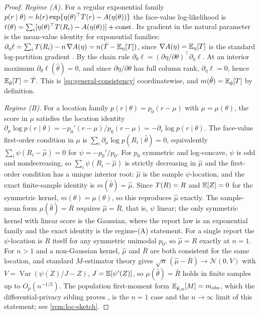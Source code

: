\begin{proof}
\emph{Regime (A).} For a regular exponential family $p(r \mid \theta)
= h(r)\exp\{\eta(\theta)^\top T(r) - A(\eta(\theta))\}$ the
face-value log-likelihood is $\ell(\theta) = \sum_i [\eta(\theta)^\top
T(R_i) - A(\eta(\theta))] + \text{const}$. Its gradient in the
natural parameter is the mean-value identity for exponential families:
$\partial_\eta \ell = \sum_i T(R_i) - n\,\nabla A(\eta) = n(\bar{T} -
\mathbb{E}_\eta[T])$, since $\nabla A(\eta) = \mathbb{E}_\eta[T]$ is the standard
log-partition gradient \citep[Ch.~5]{vandervaart1998asymptotic}. By
the chain rule $\partial_\theta \ell = (\partial\eta/\partial\theta)^\top
\partial_\eta \ell$. At an interior maximum $\partial_\theta
\ell(\hat\theta) = 0$, and since $\partial\eta/\partial\theta$ has full
column rank, $\partial_\eta \ell = 0$, hence $\mathbb{E}_{\hat\theta}[T] =
\bar{T}$. This is \eqref{eq:general-consistency} coordinatewise, and
$m(\hat\theta) = \mathbb{E}_{\hat\theta}[T]$ by definition.

\emph{Regime (B).} For a location family $p(r \mid \theta) = p_0(r -
\mu)$ with $\mu = \mu(\theta)$, the score in $\mu$ satisfies the
location identity $\partial_\mu \log p(r \mid \theta) = -p_0'(r -
\mu)/p_0(r - \mu) = -\partial_r \log p(r \mid \theta)$. The
face-value first-order condition in $\mu$ is $\sum_i \partial_\mu \log
p(R_i \mid \hat\theta) = 0$, equivalently $\sum_i \psi(R_i - \hat\mu) =
0$ for $\psi = -p_0'/p_0$. For $p_0$ symmetric and log-concave, $\psi$
is odd and nondecreasing, so $\sum_i \psi(R_i - \hat\mu)$ is strictly
decreasing in $\hat\mu$ and the first-order condition has a unique
interior root: $\hat\mu$ is the sample $\psi$-location, and the exact
finite-sample identity is $m(\hat\theta) = \hat\mu$. Since
$T(R) = R$ and $\mathbb{E}[Z] = 0$ for the symmetric kernel,
$m(\theta) = \mu(\theta)$, so this reproduces $\hat\mu$ exactly. The
sample-mean form $\mu(\hat\theta) = \bar R$ requires $\hat\mu = \bar R$,
that is, $\psi$ linear; the only symmetric kernel with linear score is
the Gaussian, where the report law is an exponential family and the
exact identity is the regime-(A) statement. For a single report the
$\psi$-location is $R$ itself for any symmetric unimodal $p_0$, so
$\hat\mu = R$ exactly at $n = 1$. For $n > 1$ and a non-Gaussian
kernel, $\hat\mu$ and $\bar R$ are both consistent for the same
location, and standard $M$-estimator theory
\citep[Ch.~5]{vandervaart1998asymptotic} gives $\sqrt{n}\,(\hat\mu -
\bar R) \to \mathcal{N}(0, V)$ with $V = \operatorname{Var}(\psi(Z)/J -
Z)$, $J = \mathbb{E}[\psi'(Z)]$, so $\mu(\hat\theta) = \bar R$ holds in finite
samples up to $O_p(n^{-1/2})$. The population first-moment form
$\mathbb{E}_{\hat\theta,\kappa}[M] = m_{\mathrm{obs}}$, which the
differential-privacy sibling proves \citep{towell2026dpcoarsening}, is
the $n = 1$ case and the $n \to \infty$ limit of this statement; see
\cref{rem:loc-sketch}.
\end{proof}

